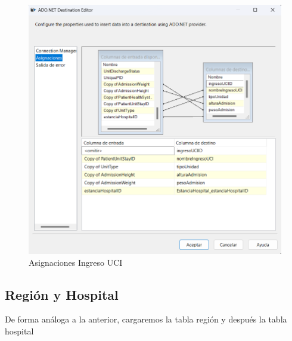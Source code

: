 \documentclass{article}
\begin{document}
	\begin{figure}[H]
		\centering
		\includegraphics[width=.7\linewidth]{./images/asignaciones/ingreso_uci.png}
		\caption{Asignaciones Ingreso UCI}
		\label{fig:asignaciones_uci}
	\end{figure}

	\subsection{Región y Hospital}
	De forma análoga a la anterior, cargaremos la tabla región y después la tabla hospital
\end{document}
